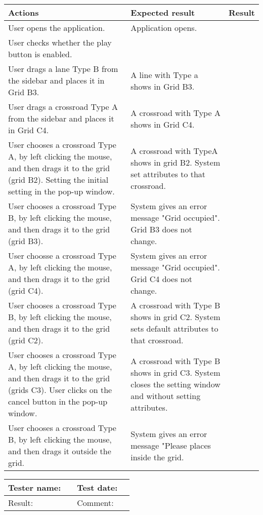 	\begin{tabularx}{\textwidth}{|X|X|p{2.5cm}|}\hline
		Actions & Expected result & Result \\\hline
		User opens the application.& Application opens. &  \pass \\\hline
		User checks whether the play button is enabled. & &  \pass \\\hline
		User drags a lane Type B from the sidebar and places it in Grid B3. & A line with Type a shows in Grid B3. & \pass \\\hline
		User drags a crossroad Type A from the sidebar and places it in Grid C4. & A crossroad with Type A shows in Grid C4. & \pass \\\hline
		User chooses a crossroad Type A, by left clicking the mouse, and then drags it to the grid (grid B2). Setting the initial setting in the pop-up window. & A crossroad with TypeA shows in grid B2. System set attributes to that crossroad. & \pass \\\hline
		User chooses a crossroad Type B, by left clicking the mouse, and then drags it to the grid (grid B3). & System gives an  error message "Grid occupied". Grid B3 does not change. & \pass\\\hline
		User choosse a crossroad Type A, by left clicking the mouse, and then drags it to the grid (grid C4). & System gives an  error message "Grid occupied". Grid C4 does not change. & \pass\\\hline
	    User chooses a crossroad Type B, by left clicking the mouse, and then drags it to the grid (grid C2). & A crossroad with Type B shows in grid C2. System sets default attributes to that crossroad. & \pass\\\hline
	    User chooses a crossroad Type A, by left clicking the mouse, and then drags it to the grid (grids C3). User clicks on the cancel button in the pop-up window. & A crossroad with Type B shows in grid C3. System closes the setting window and without setting attributes. & \pass\\\hline
	    User chooses a crossroad Type B, by left clicking the mouse, and then drags it outside the grid.& System gives an error message "Please places inside the grid. & \pass\\\hline
	     
	\end{tabularx}


\begin{tabularx}{\textwidth}{|p{3cm}X|p{3cm}X|}\hline
	Tester name: &  & Test date: & \\\hline
	Result: &   \pass & Comment: & \\\hline
\end{tabularx}

